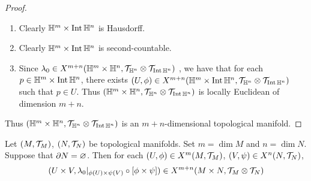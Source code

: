 \documentclass{book}
\begin{document}
\begin{proof} \
	\begin{enumerate}
		\item Clearly $\mathbb{H}^m \times \operatorname{Int} \mathbb{H}^n$ is Hausdorff.
		\item Clearly $\mathbb{H}^m \times \operatorname{Int} \mathbb{H}^n$ is second-countable.
		\item Since $\lambda_0 \in X^{m+n}(\mathbb{H}^m \times \mathbb{H}^n, \mathcal{T}_{\mathbb{H}^n} \otimes \mathcal{T}_{\operatorname{Int} \mathbb{H}^n})$ , we have that for each $p \in \mathbb{H}^m \times \operatorname{Int} \mathbb{H}^n$, there exists $(U, \phi) \in X^{m+n}(\mathbb{H}^m \times \operatorname{Int} \mathbb{H}^n, \mathcal{T}_{\mathbb{H}^n} \otimes \mathcal{T}_{\operatorname{Int} \mathbb{H}^n})$ such that $p \in U$. Thus $(\mathbb{H}^m \times \mathbb{H}^n, \mathcal{T}_{\mathbb{H}^n} \otimes \mathcal{T}_{\operatorname{Int} \mathbb{H}^n})$ is locally Euclidean of dimension $m+n$.
	\end{enumerate}
	Thus $(\mathbb{H}^m \times \mathbb{H}^n, \mathcal{T}_{\mathbb{H}^n} \otimes \mathcal{T}_{\operatorname{Int} \mathbb{H}^n})$ is an $m+n$-dimensional topological manifold.
\end{proof}


\begin{ex} 
	Let $(M, \mathcal{T}_M)$, $(N, \mathcal{T}_N)$ be topological manifolds. Set $m = \dim M$ and $n = \dim N$. Suppose that $\partial N = \varnothing$. Then for each $(U, \phi) \in X^m(M, \mathcal{T}_M)$, $(V, \psi) \in X^n(N, \mathcal{T}_N)$, 
	$$(U \times V, \lambda_0|_{\phi(U) \times \psi(V)} \circ [\phi \times \psi]) \in X^{m+n}(M \times N, \mathcal{T}_M \otimes \mathcal{T}_N)$$ 
\end{ex}
\end{document}

